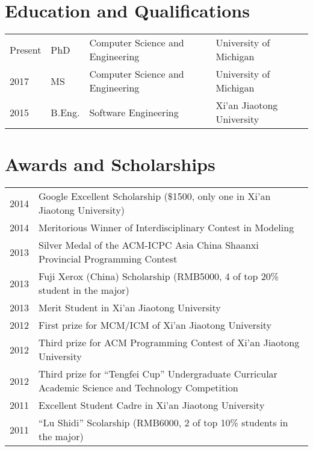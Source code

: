 \documentclass[letterpaper,11pt]{article}
\begin{document}
\maketitle

\section{Education and Qualifications}

\begin{tabular}{llll}
    Present        & PhD  & Computer Science and Engineering & University of Michigan \\
    2017           & MS   & Computer Science and Engineering & University of Michigan \\
    2015           & B.Eng. & Software Engineering & Xi'an Jiaotong University
\end{tabular}

\begin{publications}
\end{publications}

\section{Awards and Scholarships}

\begin{tabular}{lp{15cm}}
    2014 & Google Excellent Scholarship (\$1500, only one in Xi'an Jiaotong University) \\
    2014 & Meritorious Winner of Interdisciplinary Contest in Modeling \\
    2013 & Silver Medal of the ACM-ICPC Asia China
            \newline Shaanxi Provincial Programming Contest \\
    2013 & Fuji Xerox (China) Scholarship (RMB5000, 4 of top 20\% student in the major) \\
    2013 & Merit Student in Xi'an Jiaotong University \\
    2012 & First prize for MCM/ICM of Xi'an Jiaotong University \\
    2012 & Third prize for ACM Programming Contest of Xi'an Jiaotong University \\
    2012 & Third prize for ``Tengfei Cup'' Undergraduate
            \newline Curricular Academic Science and Technology Competition \\
    2011 & Excellent Student Cadre in Xi'an Jiaotong University  \\
    2011 & ``Lu Shidi'' Scolarship (RMB6000, 2 of top 10\% students in the major)
\end{tabular}
\end{document}
